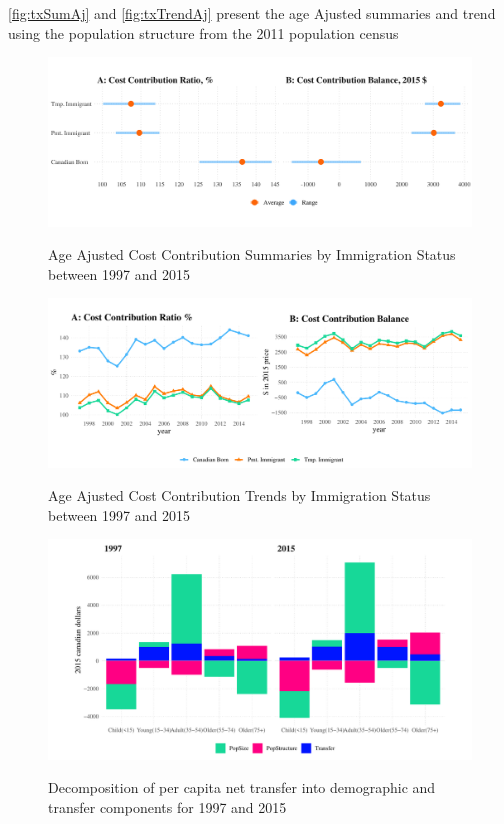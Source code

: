 \autoref{fig:txSumAj} and \autoref{fig:txTrendAj} present the age Ajusted summaries and trend using the population structure from the 2011 population census
  \begin{figure}[H]%
    \caption{Age Ajusted Cost Contribution Summaries by Immigration Status between 1997 and 2015}
    \includegraphics[width=1\textwidth]{./res/txSumAj.png}%
    \label{fig:txSumAj}%
\end{figure}%



  \begin{figure}[H]%
    \caption{Age Ajusted Cost Contribution Trends by Immigration Status between 1997 and 2015}
    \includegraphics[width=1\textwidth]{./res/txTrendAj.pdf}%
    \label{fig:txTrendAj}%
\end{figure}%




    \begin{figure}[H]%
      \caption{Decomposition of per capita net transfer into demographic and transfer components for 1997 and 2015}
      \includegraphics[width=1\textwidth]{./res/txb17_15.pdf}%
      \label{fig:txb17_15}%
  \end{figure}%



